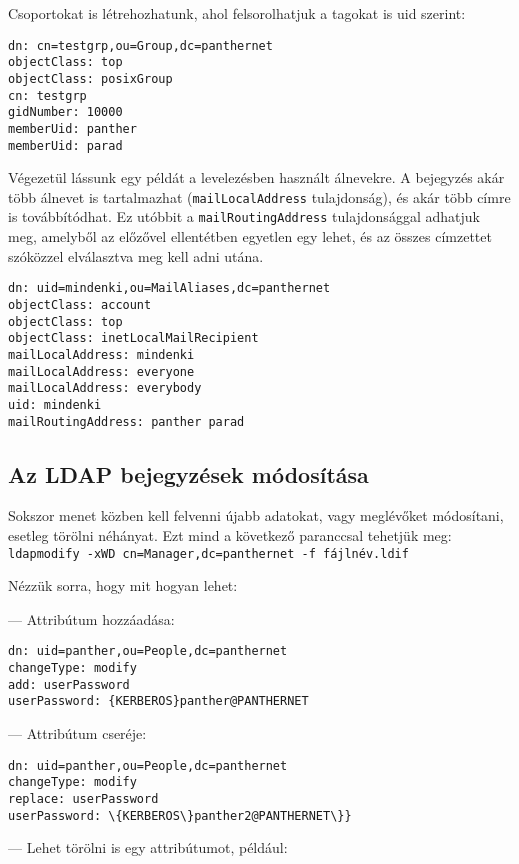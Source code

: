 \noindent Csoportokat is létrehozhatunk, ahol felsorolhatjuk a tagokat is uid szerint:

\begin{Verbatim}[frame=single]
dn: cn=testgrp,ou=Group,dc=panthernet
objectClass: top
objectClass: posixGroup
cn: testgrp
gidNumber: 10000
memberUid: panther
memberUid: parad
\end{Verbatim}


Végezetül lássunk egy példát a levelezésben használt álnevekre. A bejegyzés akár több álnevet is tartalmazhat
(\texttt{mailLocalAddress} tulajdonság), és akár több címre is továbbítódhat. Ez utóbbit a \texttt{mailRoutingAddress}
tulajdonsággal adhatjuk meg, amelyből az előzővel ellentétben egyetlen egy lehet, és az összes címzettet szóközzel
elválasztva meg kell adni utána.

\begin{Verbatim}[frame=single]
dn: uid=mindenki,ou=MailAliases,dc=panthernet
objectClass: account
objectClass: top
objectClass: inetLocalMailRecipient
mailLocalAddress: mindenki
mailLocalAddress: everyone
mailLocalAddress: everybody
uid: mindenki
mailRoutingAddress: panther parad
\end{Verbatim}


\subsection{Az LDAP bejegyzések módosítása}

Sokszor menet közben kell felvenni újabb adatokat, vagy meglévőket módosítani, esetleg törölni néhányat. Ezt mind a
következő paranccsal tehetjük meg: \texttt{ldapmodify -xWD cn=Manager,dc=panthernet -f fájlnév.ldif}

Nézzük sorra, hogy mit hogyan lehet:

\noindent  --- Attribútum hozzáadása:

\begin{Verbatim}[frame=single]
dn: uid=panther,ou=People,dc=panthernet
changeType: modify
add: userPassword
userPassword: {KERBEROS}panther@PANTHERNET
\end{Verbatim}

\noindent --- Attribútum cseréje:
\begin{Verbatim}[frame=single]
dn: uid=panther,ou=People,dc=panthernet
changeType: modify
replace: userPassword
userPassword: \{KERBEROS\}panther2@PANTHERNET\}}
\end{Verbatim}

\noindent --- Lehet törölni is egy attribútumot, például:


